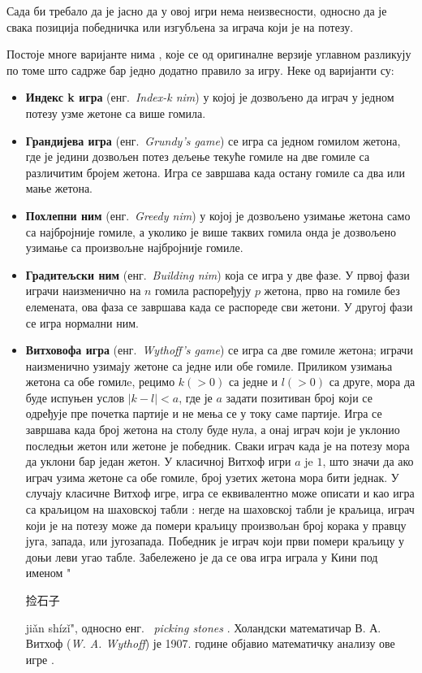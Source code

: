 \documentclass[a4paper]{article}
\begin{document}
Сада би требало да је јасно да у овој игри нема неизвесности, односно да је свака позиција победничка или изгубљена за играча који је на потезу.

Постоје многе варијанте нима \cite{ho2011combinatorial, hitotsumatsu1968mathematics}, које се од оригиналне верзије углавном разликују по томе што садрже бар једно додатно правило за игру. Неке од варијанти су:
\begin{itemize}
	\item \textbf{Индекс k игра} (енг.{~\em Index-k nim}) у којој је дозвољено да играч у једном потезу узме жетоне са више гомила. 
	\item \textbf{Грандијева игра} (енг.{~\em Grundy's game}) се игра са једном гомилом жетона, где је једини дозвољен потез дељење текуће гомиле на две гомиле са различитим бројем жетона. Игра се завршава када остану гомиле са два или мање жетона.
	\item \textbf{Похлепни ним} (енг.{~\em Greedy nim}) у којој је дозвољено узимање жетона само са најбројније гомиле, а уколико је више таквих гомила онда је дозвољено узимање са произвољне најбројније гомиле.
	\item \textbf{Градитељски ним} (енг.{~\em Building nim}) која се игра у две фазе. У првој фази играчи наизменично на $ n $ гомила распоређују $ p $ жетона, прво на гомиле без елемената, ова фаза се завршава када се распореде сви жетони. У другој фази се игра нормални ним. 
	\item \textbf{Витховофа игра} (енг.{~\em Wythoff's game}) се игра са две гомиле жетона; играчи наизменично узимају жетоне са једне или обе гомиле. Приликом узимања жетона са обе гомилe, рецимо $ k (> 0) $ са једне и $ l (> 0) $ са друге, мора да буде испуњен услов $ |k - l| < a $, где је $ a $ задати позитиван број који се одређује пре почетка партије и не мења се у току саме партије. Игра се завршава када број жетона на столу буде нула, а онај играч који је уклонио последњи жетон или жетоне је победник. Сваки играч када је на потезу мора да уклони бар један жетон. У класичној Витхоф игри $ a $ je $ 1 $, што значи да ако играч узима жетоне са обе гомиле, број узетих жетона мора бити једнак. У случају класичне Витхоф игре, игра се еквивалентно може описати и као игра са краљицом на шаховској табли \cite{larsson2010restrictions}: негде на шаховској табли је краљица, играч који је на потезу може да помери краљицу произвољан број корака у правцу југа, запада, или југозапада. Победник је играч који први помери краљицу у доњи леви угао табле. Забележено је да се ова игра играла у Кини  под именом "\begin{CJK}{UTF8}{gbsn}捡石子\end{CJK} jiǎn shízǐ", односно енг. {~\em picking stones} \cite{Yaglom}. Холандски математичар В. А. Витхоф (\textit{W. A. Wythoff}) је 1907. године објавио математичку анализу ове игре \cite{wythoff1907modification}. 
\end{itemize}
\end{document}
